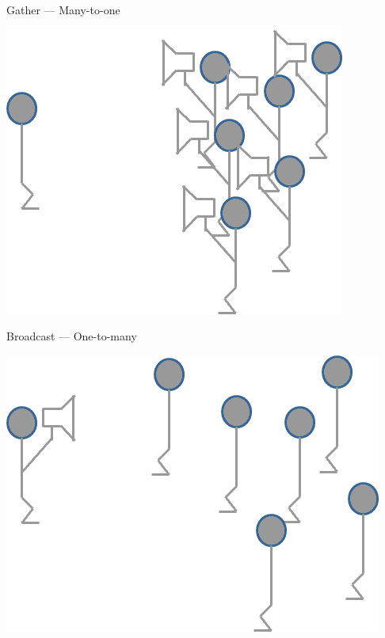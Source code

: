 \begin{frame}
  \begin{block}{Gather --- Many-to-one}
    \begin{center}
      \includegraphics[scale=.6]{../common/pics/mpiops/mpi_gather}
    \end{center}
  \end{block}
\end{frame}


\begin{frame}
  \begin{block}{Broadcast --- One-to-many}
    \begin{center}
      \includegraphics[scale=.6]{../common/pics/mpiops/mpi_bcast}
    \end{center}
  \end{block}
\end{frame}


